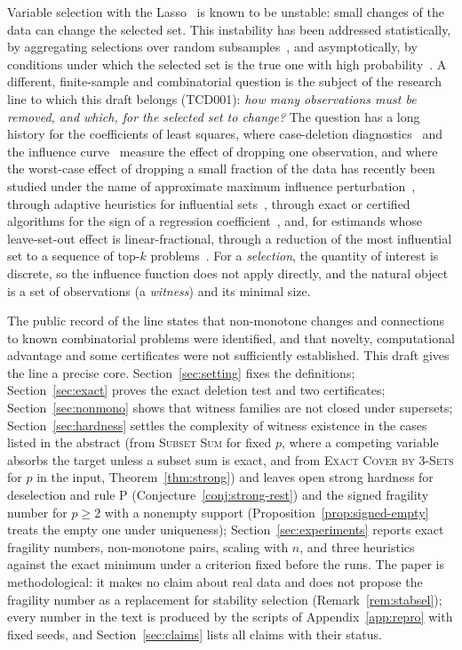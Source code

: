 \documentclass[10pt,a4paper]{article}
\theoremstyle{plain}
\theoremstyle{definition}
\theoremstyle{remark}
\newcommand{\tsc}[1]{\textnormal{\textsc{#1}}}  %
\begin{document}
Variable selection with the Lasso~\citep{tibshirani1996} is known to be unstable: small changes of the data can change the selected set. This instability has been addressed statistically, by aggregating selections over random subsamples~\citep[stability selection,][]{meinshausen2010}, and asymptotically, by conditions under which the selected set is the true one with high probability~\citep{zhao2006,wainwright2009,buhlmann2011}. A different, finite-sample and combinatorial question is the subject of the research line to which this draft belongs (TCD001): \emph{how many observations must be removed, and which, for the selected set to change?} The question has a long history for the coefficients of least squares, where case-deletion diagnostics~\citep{cook1977,belsley1980} and the influence curve~\citep{hampel1974} measure the effect of dropping one observation, and where the worst-case effect of dropping a small fraction of the data has recently been studied under the name of approximate maximum influence perturbation~\citep{broderick2020}, through adaptive heuristics for influential sets~\citep{kuschnig2021}, through exact or certified algorithms for the sign of a regression coefficient~\citep{moitra2022,freund2023,rubinstein2025}, and, for estimands whose leave-set-out effect is linear-fractional, through a reduction of the most influential set to a sequence of top-$k$ problems~\citep{konrad2026}. For a \emph{selection}, the quantity of interest is discrete, so the influence function does not apply directly, and the natural object is a set of observations (a \emph{witness}) and its minimal size.

The public record of the line states that non-monotone changes and connections to known combinatorial problems were identified, and that novelty, computational advantage and some certificates were not sufficiently established. This draft gives the line a precise core. Section~\ref{sec:setting} fixes the definitions; Section~\ref{sec:exact} proves the exact deletion test and two certificates; Section~\ref{sec:nonmono} shows that witness families are not closed under supersets; Section~\ref{sec:hardness} settles the complexity of witness existence in the cases listed in the abstract (from \tsc{Subset Sum} for fixed $p$, where a competing variable absorbs the target unless a subset sum is exact, and from \tsc{Exact Cover by 3-Sets} for $p$ in the input, Theorem~\ref{thm:strong}) and leaves open strong hardness for deselection and rule P (Conjecture~\ref{conj:strong-rest}) and the signed fragility number for $p\ge2$ with a nonempty support (Proposition~\ref{prop:signed-empty} treats the empty one under uniqueness); Section~\ref{sec:experiments} reports exact fragility numbers, non-monotone pairs, scaling with $n$, and three heuristics against the exact minimum under a criterion fixed before the runs. The paper is methodological: it makes no claim about real data and does not propose the fragility number as a replacement for stability selection (Remark~\ref{rem:stabsel}); every number in the text is produced by the scripts of Appendix~\ref{app:repro} with fixed seeds, and Section~\ref{sec:claims} lists all claims with their status.
\end{document}
